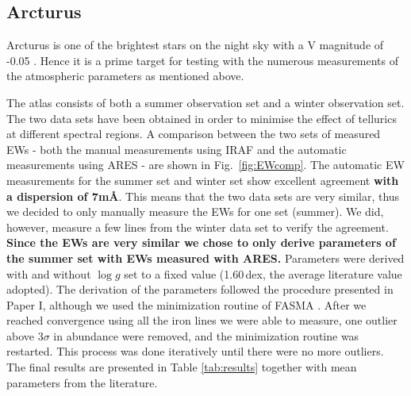 \documentclass{aa}
\begin{document}
\subsection{Arcturus}
\label{sec:arcturus}

Arcturus is one of the brightest stars on the night sky with a V magnitude of
-0.05 \citep{Ducati2002}. Hence it is a prime target for testing with the
numerous measurements of the atmospheric parameters as mentioned above.

The atlas consists of both a summer observation set and a winter observation
set. The two data sets have been obtained in order to minimise the effect of
tellurics at different spectral regions. A comparison between the two sets of
measured EWs - both the manual measurements using IRAF and the automatic
measurements using ARES - are shown in Fig.~\ref{fig:EWcomp}. The automatic EW
measurements for the summer set and winter set show excellent agreement {\bf
with a dispersion of 7m\AA{}}. This means that the two data sets are very
similar, thus we decided to only manually measure the EWs for one set (summer).
We did, however, measure a few lines from the winter data set to verify the
agreement. {\bf Since the EWs are very similar we chose to only derive
parameters of the summer set with EWs measured with ARES.} Parameters were
derived with and without $\log g$ set to a fixed value (1.60\,dex, the average
literature value adopted). The derivation of the parameters followed the
procedure presented in Paper I, although we used the minimization routine of
FASMA \citep{Andreasen2017a}. After we reached convergence using all the iron
lines we were able to measure, one outlier above $3\sigma$ in abundance were
removed, and the minimization routine was restarted. This process was done
iteratively until there were no more outliers. The final results are presented
in Table \ref{tab:results} together with mean parameters from the literature.
\end{document}
